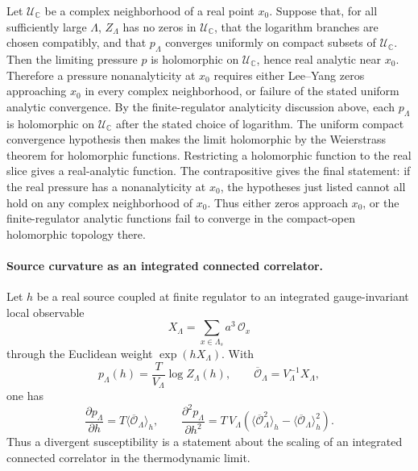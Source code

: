 \begin{remark}
\label{rem:qcd-lee-yang-zero-free-analytic-limit}
Let \(\mathcal U_{\mathbb C}\) be a complex neighborhood of a real point
\(x_0\).  Suppose that, for all sufficiently large \(\Lambda\),
\(Z_\Lambda\) has no zeros in \(\mathcal U_{\mathbb C}\), that the logarithm
branches are chosen compatibly, and that \(p_\Lambda\) converges uniformly on
compact subsets of \(\mathcal U_{\mathbb C}\).  Then the limiting pressure
\(p\) is holomorphic on \(\mathcal U_{\mathbb C}\), hence real analytic near
\(x_0\).  Therefore a pressure nonanalyticity at \(x_0\) requires either
Lee--Yang zeros approaching \(x_0\) in every complex neighborhood, or failure
of the stated uniform analytic convergence.
By the finite-regulator analyticity discussion above, each \(p_\Lambda\) is
holomorphic on \(\mathcal U_{\mathbb C}\) after the stated choice of
logarithm.  The uniform compact convergence hypothesis then makes the limit
holomorphic by the Weierstrass theorem for holomorphic functions.
Restricting a holomorphic function to the real slice gives a real-analytic
function.  The contrapositive gives the final statement: if the real pressure
has a nonanalyticity at \(x_0\), the hypotheses just listed cannot all hold on
any complex neighborhood of \(x_0\).  Thus either zeros approach \(x_0\), or
the finite-regulator analytic functions fail to converge in the compact-open
holomorphic topology there.
\end{remark}

\paragraph{Source curvature as an integrated connected correlator.}
Let \(h\) be a real source coupled at finite regulator to an integrated
gauge-invariant local observable
\[
  X_\Lambda=\sum_{x\in\Lambda_s}a^3\,\mathcal O_x
\]
through the Euclidean weight \(\exp(hX_\Lambda)\).  With
\[
  p_\Lambda(h)=\frac{T}{V_\Lambda}\log Z_\Lambda(h),
  \qquad
  \overline{\mathcal O}_\Lambda=V_\Lambda^{-1}X_\Lambda,
\]
one has
\begin{equation}
  \frac{\partial p_\Lambda}{\partial h}
  =
  T\langle\overline{\mathcal O}_\Lambda\rangle_h,
  \qquad
  \frac{\partial^2 p_\Lambda}{\partial h^2}
  =
  T\,V_\Lambda
  \left(
    \langle\overline{\mathcal O}_\Lambda^2\rangle_h
    -
    \langle\overline{\mathcal O}_\Lambda\rangle_h^2
  \right).
  \label{eq:qcd-source-curvature-susceptibility}
\end{equation}
Thus a divergent susceptibility is a statement about the scaling of an
integrated connected correlator in the thermodynamic limit.

